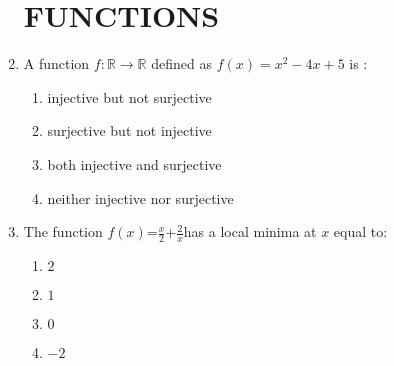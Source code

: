 \documentclass{article}
\providecommand{\brak}[1]{\ensuremath{\left(#1\right)}}
\begin{document}
				\begin{enumerate}
						\section{FUNCTIONS}
					\item A function $f :\mathbb{R} \rightarrow \mathbb{R}$ defined as $f\brak{x} = x^2 - 4x +5 $ is :
                \begin{enumerate}
                \item injective but not surjective
\item surjective but not injective
\item both injective and surjective
\item neither injective nor surjective
\end{enumerate}
\item The function $f\brak{x}$=$\frac{x}{2}$+$\frac{2}{x}$has a local minima at $x$ equal to:

        \begin{enumerate}
                        \item$2$
                        \item$1$
                        \item$0$
                        \item$-2$
                \end{enumerate}
				\end{enumerate}
\end{document}
